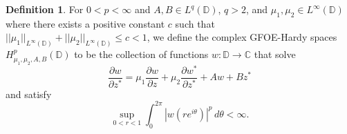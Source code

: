 \documentclass[12pt,reqno]{amsart}
\newtheorem{theorem}{Theorem}[section]
\theoremstyle{definition}
\newtheorem{deff}[theorem]{Definition}
\theoremstyle{remark}
\newcommand{\p}{\partial}
\newcommand{\disk}{\mathbb{D}}
\begin{document}
        

        \begin{deff}
            For $0 < p < \infty$ and $A, B \in L^q(\disk)$, $q>2$, and $\mu_1, \mu_2 \in L^\infty(\disk)$ where there exists a positive constant $c$ such that $||\mu_1||_{L^\infty(\disk)} + ||\mu_2||_{L^\infty(\disk)}\leq c < 1$, we define the complex GFOE-Hardy spaces $H^p_{\mu_1,\mu_2,A,B}(\disk)$ to be the collection of functions $w:\disk\to\mathbb{C}$ that solve
            \[
                \frac{\p w}{\p z^*} = \mu_1 \frac{\p w}{\p z} + \mu_2 \frac{\p w^*}{\p z^*} + Aw + B z^*
            \]
            and satisfy  
            \[
            \sup_{0 < r < 1} \int_0^{2\pi} |w(re^{i\theta})|^p\,d\theta  < \infty.
            \]
        \end{deff}

%
%
%
%
%
%
\end{document}
